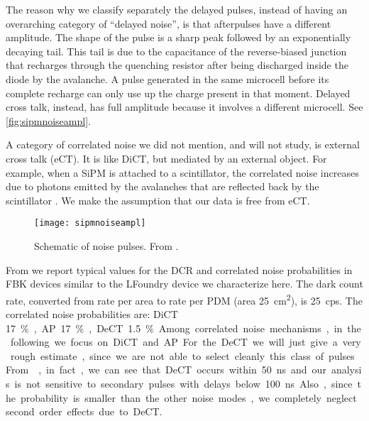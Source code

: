 The reason why we classify separately the delayed pulses, instead of having an
overarching category of ``delayed noise'', is that afterpulses have a different
amplitude. The shape of the pulse is a sharp peak followed by an exponentially
decaying tail. This tail is due to the capacitance of the reverse-biased
junction that recharges through the quenching resistor after being discharged
inside the diode by the avalanche. A pulse generated in the same microcell
before its complete recharge can only use up the charge present in that moment.
Delayed cross talk, instead, has full amplitude because it involves a different
microcell. See \autoref{fig:sipmnoiseampl}.

A category of correlated noise we did not mention, and will not study, is
external cross talk (eCT). It is like DiCT, but mediated by an external object.
For example, when a SiPM is attached to a scintillator, the correlated noise
increases due to photons emitted by the avalanches that are reflected back by
the scintillator \cite[8]{gola2014}. We make the assumption that our data is
free from eCT.

\begin{figure}
    
    \centering
    \texttt{[image: sipmnoiseampl]}
    
    \caption{\label{fig:sipmnoiseampl} Schematic of noise pulses. From
    \cite[4]{nagy2014}.}
    
\end{figure}


From \cite[tab.~3.1~p.~62]{savarese2018} we report typical values for the DCR
and correlated noise probabilities in FBK devices similar to the LFoundry
device we characterize here. The dark count rate, converted from rate per area
to rate per PDM (area \SI{25}{cm^2}), is \SI{25}{cps}. The correlated noise
probabilities are: DiCT \SI{17}\%, AP \SI{17}\%, DeCT \SI{1.5}\%.

Among correlated noise mechanisms, in the following we focus on DiCT and AP.
For the DeCT we will just give a very rough estimate, since we are not able to
select cleanly this class of pulses. From \cite[fig.~3.8~p.~54]{savarese2018},
in fact, we can see that DeCT occurs within \SI{50}{ns} and our analysis is not
sensitive to secondary pulses with delays below \SI{100}{ns}. Also, since the
probability is smaller than the other noise modes, we completely neglect second
order effects due to DeCT.

